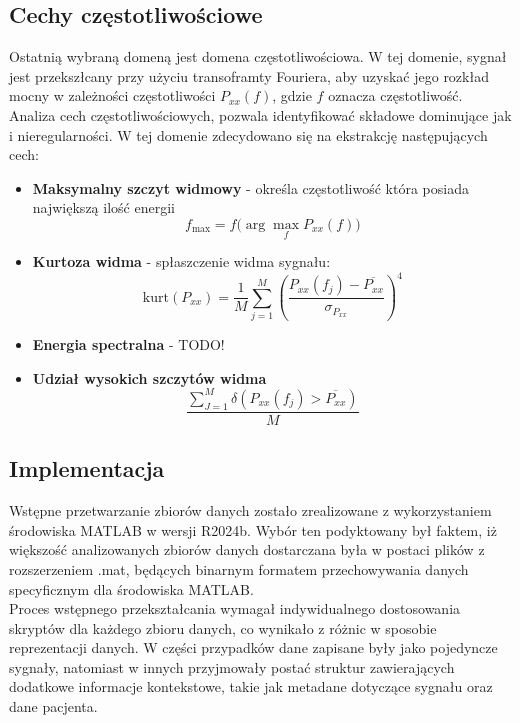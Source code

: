 \documentclass[a4paper,twoside,12pt]{book}
\begin{document}
\subsection{Cechy częstotliwościowe}
Ostatnią wybraną domeną jest domena częstotliwościowa. W tej domenie, sygnał jest przekszłcany przy użyciu transoframty Fouriera, aby uzyskać jego rozkład mocny w zależności częstotliwości $P_{xx}(f)$, gdzie $f$ oznacza częstotliwość. Analiza cech częstotliwościowych, pozwala identyfikować składowe dominujące jak i nieregularności. W tej domenie zdecydowano się na ekstrakcję następujących cech:
\begin{itemize}
	\setcounter{enumi}{9}
	\item \textbf{Maksymalny szczyt widmowy} - określa częstotliwość która posiada największą ilość energii
	      \begin{equation}
		      f_{\max} = f \bigl( \arg\max_{f} P_{xx}(f) \bigr)
	      \end{equation}


	\item \textbf{Kurtoza widma} - spłaszczenie widma sygnału:
	      \begin{equation}
		      \text{kurt}(P_{xx}) = \frac{1}{M} \sum_{j=1}^M \left( \frac{P_{xx}(f_j) - \overline{P_{xx}}}{\sigma_{P_{xx}}} \right)^4
	      \end{equation}

	\item \textbf{Energia spectralna} - TODO!

	\item \textbf{Udział wysokich szczytów widma}
	      \begin{equation}
		      \frac{\sum_{J=1}^{M} \delta(P_{xx}(f_j) > \overline{P_{xx}} )}{M}
	      \end{equation}
\end{itemize}

\subsection{Implementacja}
Wstępne przetwarzanie zbiorów danych zostało zrealizowane z wykorzystaniem środowiska MATLAB w wersji R2024b. Wybór ten podyktowany był faktem, iż większość analizowanych zbiorów danych dostarczana była w postaci plików z rozszerzeniem .mat, będących binarnym formatem przechowywania danych specyficznym dla środowiska MATLAB.\\

Proces wstępnego przekształcania wymagał indywidualnego dostosowania skryptów dla każdego zbioru danych, co wynikało z różnic w sposobie reprezentacji danych. W części przypadków dane zapisane były jako pojedyncze sygnały, natomiast w innych przyjmowały postać struktur zawierających dodatkowe informacje kontekstowe, takie jak metadane dotyczące sygnału oraz dane pacjenta.
\end{document}
